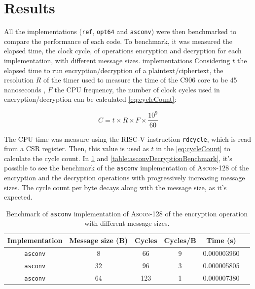 \documentclass[11pt,twoside]{article}
\begin{document}
\section{Results}
\label{section:results}

All the implementations (\texttt{ref}, \texttt{opt64} and \texttt{asconv}) were then benchmarked to compare the performance of each code. To benchmark, it was measured the elapsed time, the clock cycle, of operations encryption and decryption for each implementation, with different message sizes. implementations  Considering $t$ the elapsed time to run encryption/decryption of a plaintext/ciphertext, the resolution $R$ of the timer used to measure the time of the C906 core to be 45 nanoseconds  \cite{10179399}, $F$ the CPU frequency, the number of clock cycles used in encryption/decryption can be calculated \cref{eq:cycleCount}:

\begin{equation}
  C = t \times R \times F \times \frac{10^{9}}{60} \label{eq:cycleCount}
\end{equation}

The CPU time was measure using the RISC-V instruction \texttt{rdcycle}, which is read from a CSR register. Then, this value is used as $t$ in the \cref{eq:cycleCount} to calculate the cycle count. In \cref{table:asconvEncryptionBenchmark} and \cref{table:asconvDecryptionBenchmark}, it's possible to see the benchmark of the \texttt{asconv} implementation of \textsc{Ascon-128} of the encryption and the decryption operations with progressively increasing message sizes. The cycle count per byte decays along with the message size, as it's expected.

\begin{table}[h]
  \centering
  \begin{tabular}{|c|c|c|c|c|c|}
    \hline
    \textbf{Implementation} & \textbf{Message size (B)} &
    \textbf{Cycles}         & \textbf{Cycles/B}         & \textbf{Time (s)}                   \\ \hline

    \texttt{asconv}         & 8                         & 66                & 9 & 0.000003960 \\ \hline

    \texttt{asconv}         & 32                        & 96                & 3 & 0.000005805 \\ \hline

    \texttt{asconv}         & 64                        & 123               & 1 & 0.000007380 \\ \hline
  \end{tabular}
  \caption{Benchmark of \texttt{asconv} implementation of \textsc{Ascon-128} of the encryption operation with different message sizes.}
  \label{table:asconvEncryptionBenchmark}
\end{table}
\end{document}
